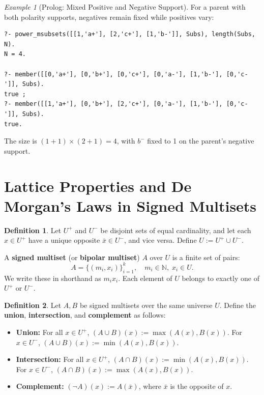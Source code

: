 \documentclass{article}
\theoremstyle{plain}
\theoremstyle{definition}
\newtheorem{definition}{Definition}
\theoremstyle{remark}
\newtheorem{example}{Example}
\newcommand{\Nat}{\mathbb{N}}
\begin{document}
\begin{example}[Prolog: Mixed Positive and Negative Support]
For a parent with both polarity supports, negatives remain fixed while positives vary:
{\small\begin{verbatim}
?- power_msubsets([[1,'a+'], [2,'c+'], [1,'b-']], Subs), length(Subs, N).
N = 4.

?- member([[0,'a+'], [0,'b+'], [0,'c+'], [0,'a-'], [1,'b-'], [0,'c-']], Subs).
true ;
?- member([[1,'a+'], [0,'b+'], [2,'c+'], [0,'a-'], [1,'b-'], [0,'c-']], Subs).
true.
\end{verbatim}
}
The size is \((1+1)\times(2+1)=4\), with \(b^-\) fixed to 1 on the parent’s negative support.
\end{example}

\section*{Lattice Properties and De Morgan's Laws in Signed Multisets}

\begin{definition}
	Let \(U^+\) and \(U^-\) be disjoint sets of equal cardinality, and let each \(x \in U^+\) have a unique opposite \(\bar{x} \in U^-\), and vice versa. Define \(U := U^+ \cup U^-\).
	
	A \textbf{signed multiset} (or \textbf{bipolar multiset}) \(A\) over \(U\) is a finite set of pairs:
	\[
	A = \{ (m_i, x_i) \}_{i=1}^k, \quad m_i \in \Nat, \; x_i \in U.
	\]
	We write these in shorthand as \(m_ix_i\). Each element of \(U\) belongs to exactly one of \(U^+\) or \(U^-\).
\end{definition}

\begin{definition}
	Let \(A, B\) be signed multisets over the same universe \(U\). Define the \textbf{union}, \textbf{intersection}, and \textbf{complement} as follows:
	
	\begin{itemize}
		\item \textbf{Union:} For all \(x \in U^+\), \((A \cup B)(x) := \max(A(x), B(x))\). For \(x \in U^-\), \((A \cup B)(x) := \min(A(x), B(x))\).
		
		\item \textbf{Intersection:} For all \(x \in U^+\), \((A \cap B)(x) := \min(A(x), B(x))\). For \(x \in U^-\), \((A \cap B)(x) := \max(A(x), B(x))\).
		
		\item \textbf{Complement:} \((\neg A)(x) := A(\bar{x})\), where \(\bar{x}\) is the opposite of \(x\).
	\end{itemize}
\end{definition}
\end{document}
